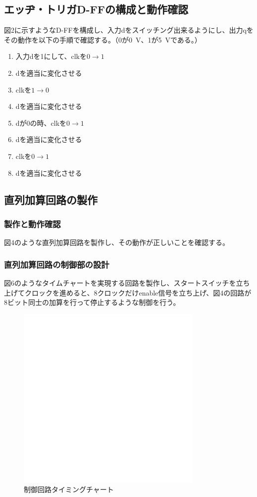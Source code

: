 \documentclass[10pt,a4j,dvipdfmx]{jsarticle}
\makeatletter
\let\@oldsubsec\subsection
\renewcommand{\subsection}[1]{\vspace{-7pt}\@oldsubsec{#1}}
\makeatother
\begin{document}
\subsection{エッヂ・トリガD-FFの構成と動作確認}
図2に示すようなD-FFを構成し、入力dをスイッチング出来るようにし、出力qをその動作を以下の手順で確認する。（0が\SI{0}{\volt}、1が\SI{5}{\volt}である。）

\begin{enumerate}
\item 入力dを1にして、clkを$0\to1$
\item dを適当に変化させる
\item clkを$1\to0$
\item dを適当に変化させる
\item dが0の時、clkを$0\to1$
\item dを適当に変化させる
\item clkを$0\to1$
\item dを適当に変化させる
\end{enumerate}

\subsection{直列加算回路の製作}
\subsubsection{製作と動作確認}
図4のような直列加算回路を製作し、その動作が正しいことを確認する。
\subsubsection{直列加算回路の制御部の設計}
図6のようなタイムチャートを実現する回路を製作し、スタートスイッチを立ち上げてクロックを進めると、8クロックだけenable信号を立ち上げ、図4の回路が8ビット同士の加算を行って停止するような制御を行う。

\begin{figure}[H]
       \centering
       \includegraphics[width=9cm]{token.png}
       \caption{制御回路タイミングチャート}
\end{figure}
\end{document}
